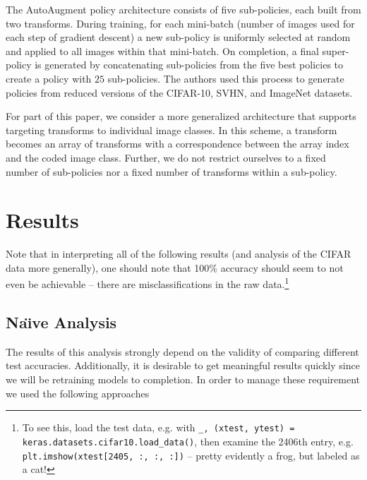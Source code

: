 \documentclass[10pt,twocolumn,letterpaper]{article}
\begin{document}
  The AutoAugment policy architecture consists of five sub-policies, each built from two transforms. During training, for each mini-batch (number of images used for each step of gradient descent) a new sub-policy is uniformly selected at random and applied to all images within that mini-batch. On completion, a final super-policy is generated by concatenating sub-policies from the five best policies to create a policy with $25$ sub-policies. The authors used this process to generate policies from reduced versions of the CIFAR-10, SVHN, and ImageNet datasets.

  For part of this paper, we consider a more generalized architecture that supports targeting transforms to individual image classes. In this scheme, a transform becomes an array of transforms with a correspondence between the array index and the coded image class. Further, we do not restrict ourselves to a fixed number of sub-policies nor a fixed number of transforms within a sub-policy.

\section{Results}

  Note that in interpreting all of the following results (and analysis of the CIFAR data more generally), one should note that 100\% accuracy should seem to not even be achievable -- there are misclassifications in the raw data.\footnote{To see this, load the test data, e.g. with \texttt{\_, (xtest, ytest) = keras.datasets.cifar10.load\_data()}, then examine the 2406th entry, e.g. \texttt{plt.imshow(xtest[2405, :, :, :])} -- pretty evidently a frog, but labeled as a cat!}

	

  \subsection{Na\"{\i}ve Analysis}
    The results of this analysis strongly depend on the validity of comparing different test accuracies. Additionally, it is desirable to get meaningful results quickly since we will be retraining models to completion. In order to manage these requirement we used the following approaches
\end{document}
